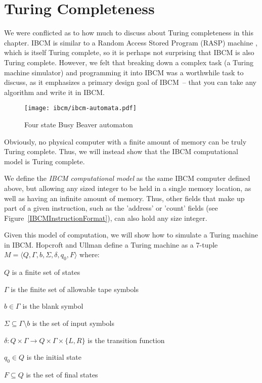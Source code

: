 \section{Turing Completeness}

We were conflicted as to how much to discuss about Turing completeness
in this chapter.  IBCM is similar to a Random Access Stored Program
(RASP) machine \cite{wikipedia:rasp}, which is itself Turing complete,
so it is perhaps not surprising that IBCM is also Turing complete.
However, we felt that breaking down a complex task (a Turing machine
simulator) and programming it into IBCM was a worthwhile task to
discuss, as it emphasizes a primary design goal of IBCM~-- that
you can take any algorithm and write it in IBCM.

\begin{figure}[h]
\centering
\texttt{[image: ibcm/ibcm-automata.pdf]}
\caption{Four state Busy Beaver automaton}
\label{BusyBeaverAutomaton}
\end{figure}

Obviously, no physical computer with a finite amount of memory can be
truly Turing complete.  Thus, we will instead show that the IBCM
computational model is Turing complete.

We define the {\em IBCM computational model} as the same IBCM computer
defined above, but allowing any sized integer to be held in a single
memory location, as well as having an infinite amount of memory.
Thus, other fields that make up part of a given instruction, such as
the 'address' or 'count' fields (see
Figure~\ref{IBCMInstructionFormat}), can also hold any size integer.

Given this model of computation, we will show how to simulate a Turing
machine in IBCM.  Hopcroft and Ullman \cite{HopcroftAndUllman} define
a Turing machine as a 7-tuple $M=\langle
Q,\Gamma,b,\Sigma,\delta,q_0,F \rangle$ where:

\begin{itemlist}
\item $Q$ is a finite set of states
\item $\Gamma$ is the finite set of allowable tape symbols
\item $b \in \Gamma$ is the blank symbol
\item $\Sigma \subseteq \Gamma \setminus {b}$ is the set of input symbols
\item $\delta : Q \times \Gamma \rightarrow Q \times \Gamma \times \{L,R\}$ is the transition function
\item $q_0 \in Q$ is the initial state
\item $F \subseteq Q$ is the set of final states
\end{itemlist}


